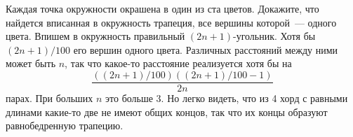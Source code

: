 \problem
Каждая точка окружности окрашена в один из ста цветов.
Докажите, что найдется вписанная в окружность трапеция, все вершины которой~---
одного цвета.
\solution
Впишем в окружность правильный $(2 n + 1)$-угольник.
Хотя бы $(2 n + 1) / 100$ его вершин одного цвета.
Различных расстояний между ними может быть $n$, так что какое-то расстояние
реализуется хотя бы на
\[
    \dfrac{((2 n + 1) / 100)((2 n + 1) / 100 - 1)}{2 n}
\]
парах.
При больших $n$ это больше 3.
Но легко видеть, что из 4 хорд с равными длинами какие-то две не имеют общих
концов, так что их концы образуют равнобедренную трапецию.
\endproblem
